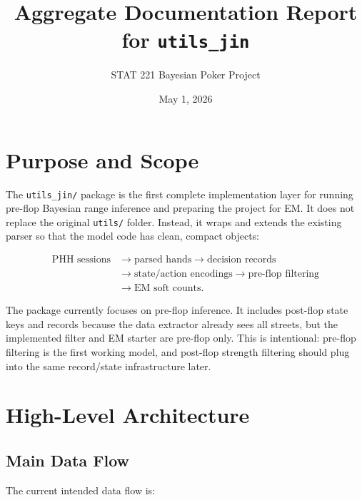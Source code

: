 \documentclass[11pt]{article}
\title{Aggregate Documentation Report for \texttt{utils\_jin}}
\author{STAT 221 Bayesian Poker Project}
\date{May 1, 2026}
\begin{document}
\maketitle

\tableofcontents
\newpage

\section{Purpose and Scope}

The \texttt{utils\_jin/} package is the first complete implementation layer for
running pre-flop Bayesian range inference and preparing the project for EM. It
does not replace the original \texttt{utils/} folder. Instead, it wraps and
extends the existing parser so that the model code has clean, compact objects:

\[
\begin{aligned}
\text{PHH sessions}
&\rightarrow \text{parsed hands}
\rightarrow \text{decision records} \\
&\rightarrow \text{state/action encodings}
\rightarrow \text{pre-flop filtering} \\
&\rightarrow \text{EM soft counts}.
\end{aligned}
\]

The package currently focuses on pre-flop inference. It includes post-flop
state keys and records because the data extractor already sees all streets, but
the implemented filter and EM starter are pre-flop only. This is intentional:
pre-flop filtering is the first working model, and post-flop strength filtering
should plug into the same record/state infrastructure later.

\section{High-Level Architecture}

\subsection{Main Data Flow}

The current intended data flow is:
\end{document}
